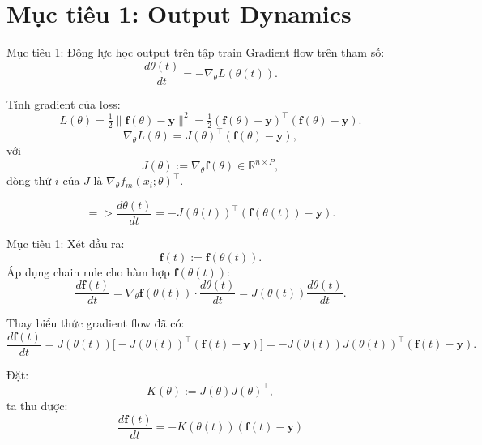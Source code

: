 \section{Mục tiêu 1: Output Dynamics}
\begin{frame}{Mục tiêu 1: Động lực học output trên tập train}
  Gradient flow trên tham số:
  \[
    \frac{d\theta(t)}{dt}
    = -\nabla_\theta L(\theta(t)).
  \]

  Tính gradient của loss:
  \[
    L(\theta) = \tfrac12\|\mathbf f(\theta) - \mathbf y\|^2
    = \tfrac12 (\mathbf f(\theta) - \mathbf y)^\top (\mathbf f(\theta) - \mathbf y).
  \]
  \[
    \nabla_\theta L(\theta)
    = J(\theta)^\top (\mathbf f(\theta) - \mathbf y),
  \]
  với
  \[
    J(\theta) := \nabla_\theta \mathbf f(\theta)
    \in\mathbb R^{n\times P},
  \]
  dòng thứ $i$ của $J$ là $\nabla_\theta f_m(x_i;\theta)^\top$.

  \[
    => \frac{d\theta(t)}{dt}
    = -J(\theta(t))^\top(\mathbf f(\theta(t)) - \mathbf y).
  \]
\end{frame}

\begin{frame}{Mục tiêu 1:}
  Xét đầu ra:
  \[
    \mathbf f(t) := \mathbf f(\theta(t)).
  \]
  Áp dụng chain rule cho hàm hợp $\mathbf f(\theta(t))$:
  \[
    \frac{d\mathbf f(t)}{dt}
    = \nabla_\theta \mathbf f(\theta(t))\cdot \frac{d\theta(t)}{dt}
    = J(\theta(t)) \frac{d\theta(t)}{dt}.
  \]

  Thay biểu thức gradient flow đã có:
  \[
    \frac{d\mathbf f(t)}{dt}
    = J(\theta(t))\big[-J(\theta(t))^\top(\mathbf f(t) - \mathbf y)\big]
    = -J(\theta(t))J(\theta(t))^\top(\mathbf f(t) - \mathbf y).
  \]

  Đặt:
  \[
    K(\theta) := J(\theta)J(\theta)^\top,
  \]
  ta thu được:
  \[
    \boxed{
      \frac{d\mathbf f(t)}{dt}
      = -K(\theta(t))(\mathbf f(t) - \mathbf y)
    }
  \]
\end{frame}
